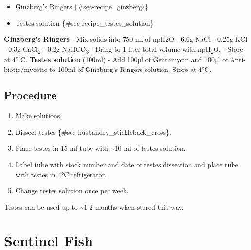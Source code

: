 \documentclass[
  letterpaper,
  DIV=11,
  numbers=noendperiod]{scrreprt}
\providecommand{\tightlist}{%
  \setlength{\itemsep}{0pt}\setlength{\parskip}{0pt}}\usepackage{longtable,booktabs,array}
\begin{document}
\begin{itemize}
\tightlist
\item
  Ginzberg's Ringers \{\#sec-recipe\_ginzbergs\}
\item
  Testes solution \{\#sec-recipe\_testes\_solution\}
\end{itemize}

\textbf{Ginzberg's Ringers} - Mix solids into 750 ml of npH2O - 6.6g
NaCl - 0.25g KCl - 0.3g CaCl\textsubscript{2} - 0.2g
NaHCO\textsubscript{3} - Bring to 1 liter total volume with
npH\textsubscript{2}O. - Store at 4° C. \textbf{Testes solution} (100ml)
- Add 100μl of Gentamycin and 100μl of Anti-biotic/mycotic to 100ml of
Ginzburg's Ringers solution. Store at 4°C.

\hypertarget{procedure-50}{%
\section{Procedure}\label{procedure-50}}

\begin{enumerate}
\def\labelenumi{\arabic{enumi}.}
\tightlist
\item
  Make solutions
\item
  Dissect testes \{\#sec-husbandry\_stickleback\_cross\}.
\item
  Place testes in 15 ml tube with \textasciitilde10 ml of testes
  solution.
\item
  Label tube with stock number and date of testes dissection and place
  tube with testes in 4°C refrigerator.
\item
  Change testes solution once per week.
\end{enumerate}

\begin{tcolorbox}[enhanced jigsaw, rightrule=.15mm, title=\textcolor{quarto-callout-warning-color}{\faExclamationTriangle}\hspace{0.5em}{NOTES}, titlerule=0mm, opacitybacktitle=0.6, toprule=.15mm, bottomrule=.15mm, opacityback=0, left=2mm, colframe=quarto-callout-warning-color-frame, breakable, coltitle=black, colback=white, colbacktitle=quarto-callout-warning-color!10!white, bottomtitle=1mm, leftrule=.75mm, toptitle=1mm, arc=.35mm]

Testes can be used up to \textasciitilde1-2 months when stored this way.

\end{tcolorbox}

\hypertarget{sec-husbandry-sentinel_fish}{%
\chapter{Sentinel Fish}\label{sec-husbandry-sentinel_fish}}
\end{document}
